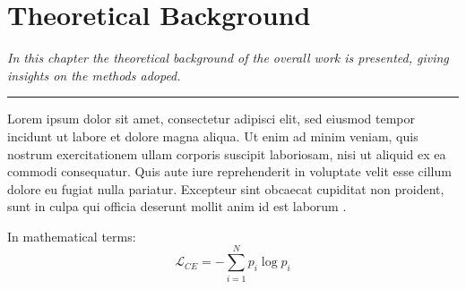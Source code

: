 \chapter{Theoretical Background}\label{ch:bg}
\textit{In this chapter the theoretical background of the overall work is presented, giving insights on the methods adoped.}
\vspace{0.25cm}
\par\fancybreak{$***$}\par
\vspace{0.35cm}

Lorem ipsum dolor sit amet, consectetur adipisci elit, sed eiusmod tempor incidunt ut labore et dolore magna aliqua. Ut enim ad minim veniam, quis nostrum exercitationem ullam corporis suscipit laboriosam, nisi ut aliquid ex ea commodi consequatur. Quis aute iure reprehenderit in voluptate velit esse cillum dolore eu fugiat nulla pariatur. Excepteur sint obcaecat cupiditat non proident, sunt in culpa qui officia deserunt mollit anim id est laborum \cite{hu2020randlanet}.

In mathematical terms:
\begin{equation}
\mathcal{L}_{CE} = -\sum_{i=1}^{N}p_i \log p_i
\end{equation}